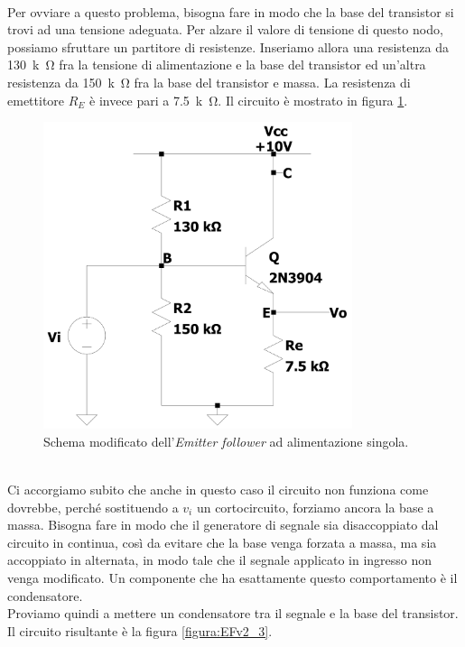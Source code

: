 \documentclass{report}
\begin{document}
\\\indent Per ovviare a questo problema, bisogna fare in modo che la base del transistor si trovi ad una tensione adeguata. Per alzare il valore di tensione di questo nodo, possiamo sfruttare un partitore di resistenze. Inseriamo allora una resistenza da \SI{130}{k\ohm} fra la tensione di alimentazione e la base del transistor ed un'altra resistenza da \SI{150}{k\ohm} fra la base del transistor e massa. La resistenza di emettitore $R_E$ è invece pari a \SI{7.5}{k\ohm}. Il circuito è mostrato in figura \ref{figura:EFv2_2}.
\begin{figure}[h]
\centering
\includegraphics[height=9cm]{immagini/EFv2_2}
\caption{Schema modificato dell'\textit{Emitter follower} ad alimentazione singola.}
\label{figura:EFv2_2}
\end{figure}
\\\indent Ci accorgiamo subito che anche in questo caso il circuito non funziona come dovrebbe, perché sostituendo a $v_i$ un cortocircuito, forziamo ancora la base a massa. Bisogna fare in modo che il generatore di segnale sia disaccoppiato dal circuito in continua, così da evitare che la base venga forzata a massa, ma sia accoppiato in alternata, in modo tale che il segnale applicato in ingresso non venga modificato. Un componente che ha esattamente questo comportamento è il condensatore. \\Proviamo quindi a mettere un condensatore tra il segnale e la base del transistor. Il circuito risultante è la figura \ref{figura:EFv2_3}.
\end{document}
